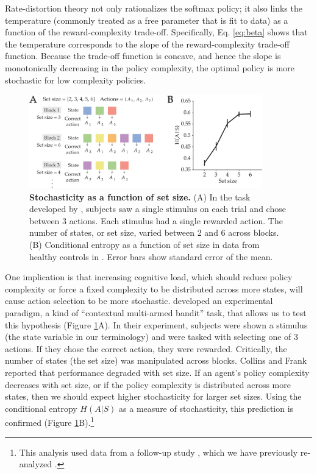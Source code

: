 \documentclass[11pt]{article}
\begin{document}
Rate-distortion theory not only rationalizes the softmax policy; it also links the temperature (commonly treated as a free parameter that is fit to data) as a function of the reward-complexity trade-off. Specifically, Eq. \ref{eq:beta} shows that the temperature corresponds to the slope of the reward-complexity trade-off function. Because the trade-off function is concave, and hence the slope is monotonically decreasing in the policy complexity, the optimal policy is more stochastic for low complexity policies.

\begin{figure}
    \centering
    \includegraphics[width=0.9\textwidth]{figs/entropy.pdf}
    \caption{\textbf{Stochasticity as a function of set size.} (A) In the task developed by \cite{collins12}, subjects saw a single stimulus on each trial and chose between 3 actions. Each stimulus had a single rewarded action. The number of states, or set size, varied between 2 and 6 across blocks.  (B) Conditional entropy as a function of set size in data from healthy controls in \citet{collins14}. Error bars show standard error of the mean.}
    \label{fig:stochasticity}
\end{figure}

One implication is that increasing cognitive load, which should reduce policy complexity or force a fixed complexity to be distributed across more states, will cause action selection to be more stochastic. \citet{collins12} developed an experimental paradigm, a kind of ``contextual multi-armed bandit'' task, that allows us to test this hypothesis (Figure \ref{fig:stochasticity}A). In their experiment, subjects were shown a stimulus (the state variable in our terminology) and were tasked with selecting one of 3 actions. If they chose the correct action, they were rewarded. Critically, the number of states (the set size) was manipulated across blocks. Collins and Frank reported that performance degraded with set size. If an agent's policy complexity decreases with set size, or if the policy complexity is distributed across more states, then we should expect higher stochasticity for larger set sizes. Using the conditional entropy $H(A|S)$ as a measure of stochasticity, this prediction is confirmed (Figure \ref{fig:stochasticity}B).\footnote{This analysis used data from a follow-up study \citep{collins14}, which we have previously re-analyzed \citep{gershmanlai20}.}
\end{document}
